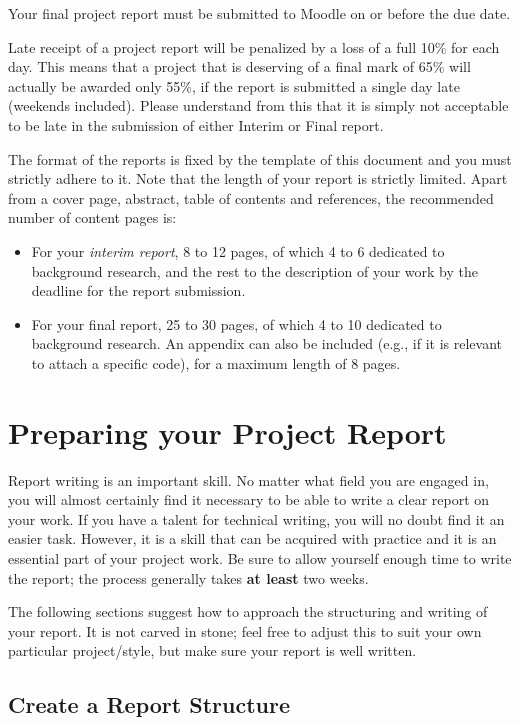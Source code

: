 \documentclass[]{final_report}
\begin{document}
Your final project report must be submitted to Moodle on or before the due date.

Late receipt of a project report will be penalized by a loss of a full 10\% for each day. This means that a project that is deserving of a final mark of 65\% will actually be awarded only 55\%, if the report is submitted a single day late (weekends included). Please understand from this that it is simply not acceptable to be late in the submission of either Interim or Final report.

The format of the reports is fixed by the template of this document and you must  strictly adhere to it.  Note that the length of your report is strictly limited. Apart from a cover page, abstract, table of contents and references, the recommended number of content pages is:

\begin{itemize}
\item For your \emph{interim report}, 8 to 12 pages, of which 4 to 6 dedicated to background research, and the rest to the description of your work by the deadline for the report submission.

\item For your final report, 25 to 30 pages, of which 4 to 10 dedicated to background research. An appendix can also be included (e.g., if it is relevant to attach a specific code), for a maximum length of 8 pages.
\end{itemize}

\chapter{Preparing your Project Report}

Report writing is an important skill. No matter what field you are engaged in, you will almost certainly find it necessary to be able to write a clear report on your work. If you have a talent for technical writing, you will no doubt find it an easier task. However, it is a skill that can be acquired with practice and it is an essential part of your project work. Be sure to allow yourself enough time to write the report; the process generally takes {\bf at least} two weeks. 

The following sections suggest how to approach the structuring and writing of your report. It is not carved in stone; feel free to adjust this to suit your own particular project/style, but make sure your report is well written.

\section{Create a Report Structure}
\end{document}
